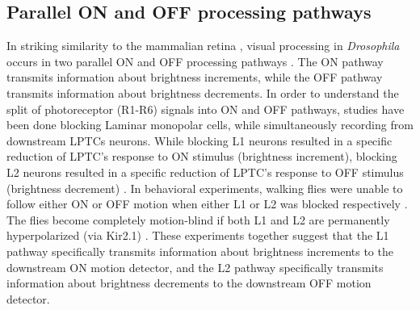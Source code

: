 \subsection{Parallel ON and OFF processing pathways}
In striking similarity to the mammalian retina \parencite{Masland2012}, visual processing in \textit{Drosophila} occurs in two parallel ON and OFF processing pathways \parencite{Borst2015}. The ON pathway transmits information about brightness increments, while the OFF pathway transmits information about brightness decrements. In order to understand the split of photoreceptor (R1-R6) signals into ON and OFF pathways, studies have been done blocking Laminar monopolar cells, while simultaneously recording from downstream LPTCs neurons. While blocking L1 neurons resulted in a specific reduction of LPTC's response to ON stimulus (brightness increment), blocking L2 neurons resulted in a specific reduction of LPTC's response to OFF stimulus (brightness decrement) \parencite{Joesch2010}. In behavioral experiments, walking flies were unable to follow either ON or OFF motion when either L1 or L2 was blocked respectively \parencite{Clark2011, Maisak2013}. The flies become completely motion-blind if both L1 and L2 are permanently hyperpolarized (via Kir2.1) \parencite{Tuthill2013, Bahl2013}. These experiments together suggest that the L1 pathway specifically transmits information about brightness increments to the downstream ON motion detector, and the L2 pathway specifically transmits information about brightness decrements to the downstream OFF motion detector. 

